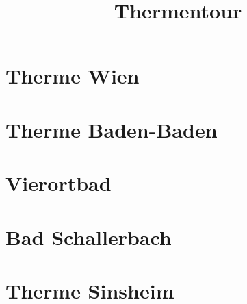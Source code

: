 \documentclass{article}
\title{Thermentour}
\begin{document}
\maketitle

\section{Therme Wien}

\section{Therme Baden-Baden}

\section{Vierortbad}

\section{Bad Schallerbach}

\section{Therme Sinsheim}
\end{document}
